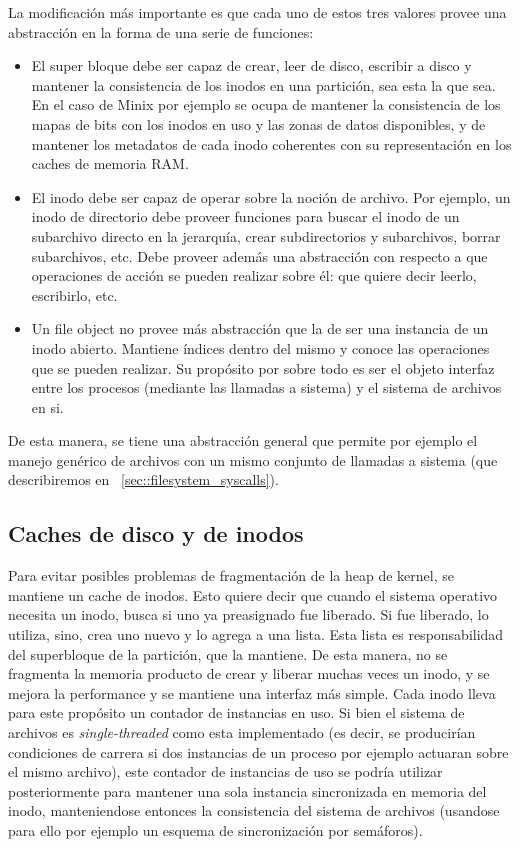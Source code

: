 La modificaci\'on m\'as importante es que cada uno de estos tres valores provee una abstracci\'on en la forma de una serie de funciones:

\begin{itemize}
	\item El super bloque debe ser capaz de crear, leer de disco, escribir a disco y mantener la consistencia de los inodos en una partici\'on,
	sea esta la que sea. En el caso de Minix por ejemplo se ocupa de mantener la consistencia de los mapas de bits con los inodos en uso y las
	zonas de datos disponibles, y de mantener los metadatos de cada inodo coherentes con su representaci\'on en los caches de memoria RAM.
	\item El inodo debe ser capaz de operar sobre la noci\'on de archivo. Por ejemplo, un inodo de directorio debe proveer funciones para
	buscar el inodo de un subarchivo directo en la jerarqu\'ia, crear subdirectorios y subarchivos, borrar subarchivos, etc. Debe proveer
	adem\'as una abstracci\'on con respecto a que operaciones de acci\'on se pueden realizar sobre \'el: que quiere decir leerlo, escribirlo,
	etc.
	\item Un file object no provee m\'as abstracci\'on que la de ser una instancia de un inodo abierto. Mantiene \'indices dentro del mismo y
	conoce las operaciones que se pueden realizar. Su prop\'osito por sobre todo es ser el objeto interfaz entre los procesos (mediante las
	llamadas a sistema) y el sistema de archivos en si.
\end{itemize}

De esta manera, se tiene una abstracci\'on general que permite por ejemplo el manejo gen\'erico de archivos con un mismo conjunto de llamadas
a sistema (que describiremos en ~\ref{sec::filesystem_syscalls}).

\subsection{Caches de disco y de inodos}

Para evitar posibles problemas de fragmentaci\'on de la heap de kernel, se mantiene un cache de inodos. Esto quiere decir que cuando el sistema operativo
necesita un inodo, busca si uno ya preasignado fue liberado. Si fue liberado, lo utiliza, sino, crea uno nuevo y lo agrega a una lista. Esta
lista es responsabilidad del superbloque de la partici\'on, que la mantiene. De esta manera, no se fragmenta la memoria producto de crear y
liberar muchas veces un inodo, y se mejora la performance y se mantiene una interfaz m\'as simple. Cada inodo lleva para este prop\'osito un
contador de instancias en uso. Si bien el sistema de archivos es \textit{single-threaded} como esta implementado (es decir, se producir\'ian
condiciones de carrera si dos instancias de un proceso por ejemplo actuaran sobre el mismo archivo), este contador de instancias de uso se
podr\'ia utilizar posteriormente para mantener una sola instancia sincronizada en memoria del inodo, manteniendose entonces la consistencia
del sistema de archivos (usandose para ello por ejemplo un esquema de sincronizaci\'on por sem\'aforos).

